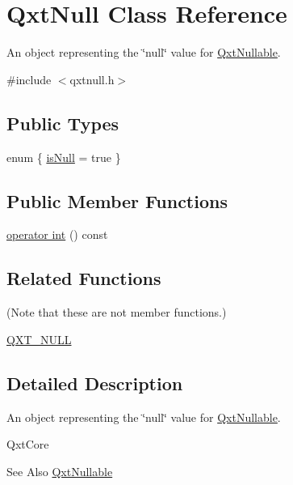 \hypertarget{struct_qxt_null}{\section{Qxt\-Null Class Reference}
\label{struct_qxt_null}
}


An object representing the \char`\"{}null\char`\"{} value for \hyperlink{class_qxt_nullable}{Qxt\-Nullable}.  




{\ttfamily \#include $<$qxtnull.\-h$>$}

\subsection*{Public Types}
\begin{DoxyCompactItemize}
\item 
enum \{ \hyperlink{struct_qxt_null_af8be04a67805860e8a3a0d84f350dee0ad6b0187994a93c18c6e316953bded47d}{is\-Null} = true
 \}
\end{DoxyCompactItemize}
\subsection*{Public Member Functions}
\begin{DoxyCompactItemize}
\item 
\hyperlink{struct_qxt_null_a481fef6fbeb12143dff84dcc33f59934}{operator int} () const 
\end{DoxyCompactItemize}
\subsection*{Related Functions}
(Note that these are not member functions.) \begin{DoxyCompactItemize}
\item 
\hyperlink{struct_qxt_null_aa80fa78e12057b65d076663dfa857dce}{Q\-X\-T\-\_\-\-N\-U\-L\-L}
\end{DoxyCompactItemize}


\subsection{Detailed Description}
An object representing the \char`\"{}null\char`\"{} value for \hyperlink{class_qxt_nullable}{Qxt\-Nullable}. 

Qxt\-Core

\begin{DoxySeeAlso}{See Also}
\hyperlink{class_qxt_nullable}{Qxt\-Nullable} 
\end{DoxySeeAlso}


